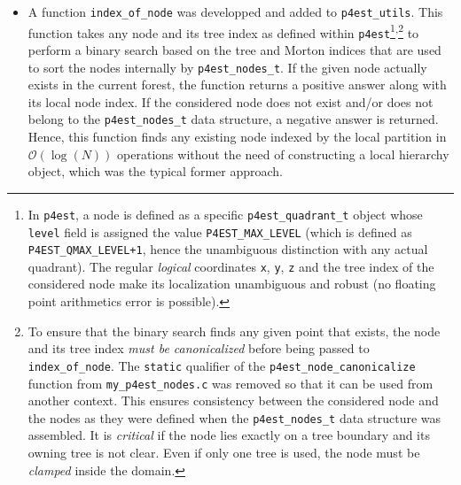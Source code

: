 \documentclass[11pt, a4paper]{article}
\theoremstyle{remark}
\begin{document}
\begin{itemize}
 \item A function \verb|index_of_node| was developped and added to \verb|p4est_utils|. This function takes any node and its tree index as defined within \verb|p4est|\footnote{In \texttt{p4est}, a node is defined as a specific \texttt{p4est\_quadrant\_t} object whose \texttt{level} field is assigned the value \texttt{P4EST\_MAX\_LEVEL} (which is defined as \texttt{P4EST\_QMAX\_LEVEL+1}, hence the unambiguous distinction with any actual quadrant). The regular \emph{logical} coordinates \texttt{x}, \texttt{y}, \texttt{z} and the tree index of the considered node make its localization unambiguous and robust (no floating point arithmetics error is possible).}\textsuperscript{,}\footnote{To ensure that the binary search finds any given point that exists, the node and its tree index \emph{must be canonicalized} before being passed to \texttt{index\_of\_node}. The \texttt{static} qualifier of the \texttt{p4est\_node\_canonicalize} function from \texttt{my\_p4est\_nodes.c} was removed so that it can be used from another context. This ensures consistency between the considered node and the nodes as they were defined when the \texttt{p4est\_nodes\_t} data structure was assembled. It is \emph{critical} if the node lies exactly on a tree boundary and its owning tree is not clear. Even if only one tree is used, the node must be \emph{clamped} inside the domain.} to perform a binary search based on the tree and Morton indices that are used to sort the nodes internally by \verb|p4est_nodes_t|. If the given node actually exists in the current forest, the function returns a positive answer along with its local node index. If the considered node does not exist and/or does not belong to the \verb|p4est_nodes_t| data structure, a negative answer is returned.\\ 
 Hence, this function finds any existing node indexed by the local partition in $\mathcal{O}\left( \log\left( N \right) \right)$ operations without the need of constructing a local hierarchy object, which was the typical former approach.
\end{itemize}
\end{document}
